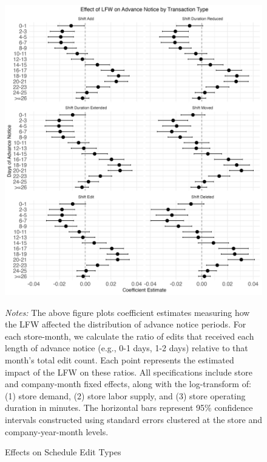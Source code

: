 \documentclass[letterpaper,11pt,leqno]{article}
\theoremstyle{paper}
\newcommand{\note}[2][]{\parbox{\textwidth}{\footnotesize\vspace*{10pt}\textit{#1}#2}}
\begin{document}
\begin{figure}[!htb]
\centering
\caption{Effects on Schedule Edit Types}
\includegraphics[scale=0.15]{Figures_Revision_2/advance_notice_gen_plot_new_ols.jpeg}
\vspace{-0.50cm}
\note{\scriptsize \singlespacing \textit{Notes: } The above figure plots coefficient estimates measuring how the LFW affected the distribution of advance notice periods. For each store-month, we calculate the ratio of edits that received each length of advance notice (e.g., 0-1 days, 1-2 days) relative to that month's total edit count. Each point represents the estimated impact of the LFW on these ratios. All specifications include store and company-month fixed effects, along with the log-transform of: (1) store demand, (2) store labor supply, and (3) store operating duration in minutes. The horizontal bars represent 95\% confidence intervals constructed using standard errors clustered at the store and company-year-month levels. }
\label{f:adv_notice_gen}
\end{figure}
\end{document}
